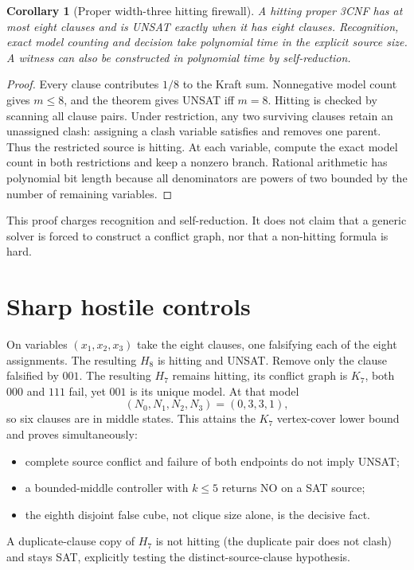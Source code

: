 \documentclass[11pt]{article}
\newtheorem{corollary}{Corollary}
\begin{document}
\begin{corollary}[Proper width-three hitting firewall]
A hitting proper 3CNF has at most eight clauses and is UNSAT exactly when it has
eight clauses.  Recognition, exact model counting and decision take polynomial
time in the explicit source size.  A witness can also be constructed in polynomial
time by self-reduction.
\end{corollary}
\begin{proof}
Every clause contributes $1/8$ to the Kraft sum.  Nonnegative model count gives
$m\le8$, and the theorem gives UNSAT iff $m=8$.  Hitting is checked by scanning
all clause pairs.  Under restriction, any two surviving clauses retain an
unassigned clash: assigning a clash variable satisfies and removes one parent.
Thus the restricted source is hitting.  At each variable, compute the exact model
count in both restrictions and keep a nonzero branch.  Rational arithmetic has
polynomial bit length because all denominators are powers of two bounded by the
number of remaining variables.
\end{proof}
This proof charges recognition and self-reduction.  It does not claim that a
generic solver is forced to construct a conflict graph, nor that a non-hitting
formula is hard.

\section{Sharp hostile controls}
On variables $(x_1,x_2,x_3)$ take the eight clauses, one falsifying each of the
eight assignments.  The resulting $H_8$ is hitting and UNSAT.  Remove only the
clause falsified by $001$.  The resulting $H_7$ remains hitting, its conflict
graph is $K_7$, both $000$ and $111$ fail, yet $001$ is its unique model.  At that
model
\[
(N_0,N_1,N_2,N_3)=(0,3,3,1),
\]
so six clauses are in middle states.  This attains the $K_7$ vertex-cover lower
bound and proves simultaneously:
\begin{itemize}
\item complete source conflict and failure of both endpoints do not imply UNSAT;
\item a bounded-middle controller with $k\le5$ returns NO on a SAT source;
\item the eighth disjoint false cube, not clique size alone, is the decisive fact.
\end{itemize}
A duplicate-clause copy of $H_7$ is not hitting (the duplicate pair does not
clash) and stays SAT, explicitly testing the distinct-source-clause hypothesis.
\end{document}

